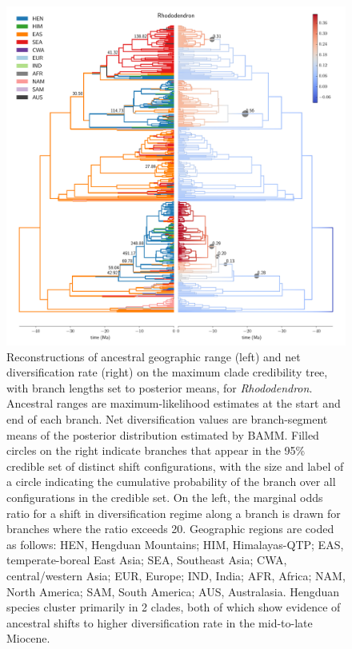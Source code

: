 \documentclass[9pt,twocolumn,twoside,lineno]{pnas-new}
\begin{document}
\begin{figure}
\centering
\includegraphics[width=.99\linewidth]{figures/Rhododendron-supfig/Rhododendron-supfig.pdf}
\caption{Reconstructions of ancestral geographic range (left) and net
  diversification rate (right) on the maximum clade credibility tree,
  with branch lengths set to posterior means, for
  \textit{Rhododendron}. Ancestral ranges are maximum-likelihood
  estimates at the start and end of each branch. Net diversification
  values are branch-segment means of the posterior distribution
  estimated by BAMM. Filled circles on the right indicate branches
  that appear in the 95\% credible set of distinct shift
  configurations, with the size and label of a circle indicating the
  cumulative probability of the branch over all configurations in the
  credible set. On the left, the marginal odds ratio for a shift in
  diversification regime along a branch is drawn for branches where
  the ratio exceeds 20. Geographic regions are coded as follows: HEN,
  Hengduan Mountains; HIM, Himalayas-QTP; EAS, temperate-boreal East
  Asia; SEA, Southeast Asia; CWA, central/western Asia; EUR, Europe;
  IND, India; AFR, Africa; NAM, North America; SAM, South America;
  AUS, Australasia. Hengduan species cluster primarily in 2 clades,
  both of which show evidence of ancestral shifts to higher
  diversification rate in the mid-to-late Miocene.}
\label{fig:rhododendron}
\end{figure}
\end{document}
